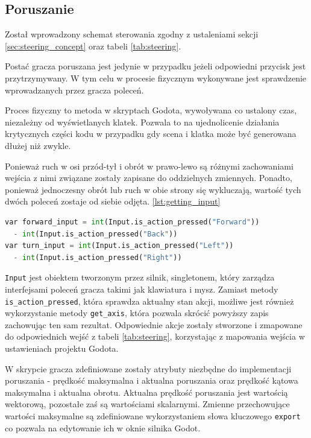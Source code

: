 \subsection{Poruszanie}
Został wprowadzony schemat sterowania zgodny z ustaleniami sekcji \ref{sec:steering_concept} oraz tabeli \ref{tab:steering}. 

Postać gracza poruszana jest jedynie w przypadku jeżeli odpowiedni przycisk jest przytrzymywany. W tym celu w procesie fizycznym wykonywane jest sprawdzenie wprowadzanych przez gracza poleceń. 

Proces fizyczny to metoda w skryptach Godota, wywoływana co ustalony czas, niezależny od wyświetlanych klatek. Pozwala to na ujednolicenie działania krytycznych części kodu w przypadku gdy scena i klatka może być generowana dłużej niż zwykle.

Ponieważ ruch w osi przód-tył i obrót w prawo-lewo są różnymi zachowaniami wejścia z nimi związane zostały zapisane do oddzielnych zmiennych. Ponadto, ponieważ jednoczesny obrót lub ruch w obie strony się wykluczają, wartość tych dwóch poleceń zostaje od siebie odjęta. \ref{lst:getting_input}

\begin{lstlisting}[language=python,caption=Kod pobierający polecenia gracza, label=lst:getting_input,basicstyle=\footnotesize\ttfamily]
var forward_input = int(Input.is_action_pressed("Forward")) 
  - int(Input.is_action_pressed("Back"))
var turn_input = int(Input.is_action_pressed("Left")) 
  - int(Input.is_action_pressed("Right"))
\end{lstlisting}

\texttt{Input} jest obiektem tworzonym przez silnik, singletonem, który zarządza interfejsami poleceń gracza takimi jak klawiatura i mysz. Zamiast metody \texttt{is\_action\_pressed}, która sprawdza aktualny stan akcji, możliwe jest również wykorzystanie metody \texttt{get\_axis}, która pozwala skrócić powyższy zapis zachowując ten sam rezultat. Odpowiednie akcje zostały stworzone i zmapowane do odpowiednich wejść z tabeli \ref{tab:steering}, korzystając z mapowania wejścia w ustawieniach projektu Godota.

W skrypcie gracza zdefiniowane zostały atrybuty niezbędne do implementacji poruszania - prędkość maksymalna i aktualna poruszania oraz prędkość kątowa maksymalna i aktualna obrotu. Aktualna prędkość poruszania jest wartością wektorową, pozostałe zaś są wartościami skalarnymi. Zmienne przechowujące wartości maksymalne są zdefiniowane wykorzystaniem słowa kluczowego \texttt{export} co pozwala na edytowanie ich w oknie silnika Godot.

